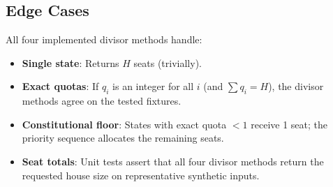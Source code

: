 \subsection{Edge Cases}

All four implemented divisor methods handle:
\begin{itemize}
  \item \textbf{Single state}: Returns $H$ seats (trivially).
  \item \textbf{Exact quotas}: If $q_i$ is an integer for all $i$
    (and $\sum q_i = H$), the divisor methods agree on the tested fixtures.
  \item \textbf{Constitutional floor}: States with exact quota $< 1$
    receive 1 seat; the priority sequence allocates the remaining seats.
  \item \textbf{Seat totals}: Unit tests assert that all four divisor methods
    return the requested house size on representative synthetic inputs.
\end{itemize}
